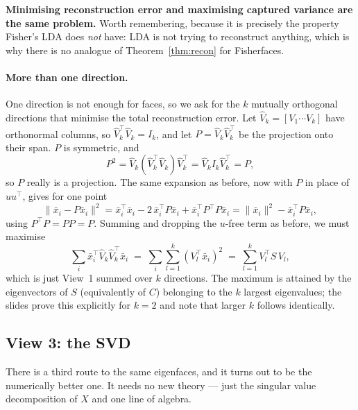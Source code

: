 \documentclass[11pt]{article}
\theoremstyle{definition}
\theoremstyle{remark}
\begin{document}
\textbf{Minimising reconstruction error and maximising captured variance are the
same problem.} Worth remembering, because it is precisely the property Fisher's
LDA does \emph{not} have: LDA is not trying to reconstruct anything, which is why
there is no analogue of Theorem~\ref{thm:recon} for Fisherfaces.

\paragraph{More than one direction.} One direction is not enough for faces, so we
ask for the $k$ mutually orthogonal directions that minimise the total
reconstruction error. Let $\hat{V}_k=[V_1\cdots V_k]$ have orthonormal columns, so
$\hat{V}_k^{\!\top}\hat{V}_k=I_k$, and let $P=\hat{V}_k\hat{V}_k^{\!\top}$ be the
projection onto their span. $P$ is symmetric, and
\[
  P^2=\hat{V}_k(\hat{V}_k^{\!\top}\hat{V}_k)\hat{V}_k^{\!\top}=\hat{V}_k I_k\hat{V}_k^{\!\top}=P,
\]
so $P$ really is a projection. The same expansion as before, now with $P$ in place
of $uu^{\!\top}$, gives for one point
\[
  \|\bar{x}_i-P\bar{x}_i\|^2
  = \bar{x}_i^{\!\top}\bar{x}_i - 2\,\bar{x}_i^{\!\top} P\bar{x}_i + \bar{x}_i^{\!\top} P^{\!\top}P\bar{x}_i
  = \|\bar{x}_i\|^2 - \bar{x}_i^{\!\top} P\bar{x}_i ,
\]
using $P^{\!\top}P = PP = P$. Summing and dropping the $u$-free term as before, we
must maximise
\[
  \sum_{i} \bar{x}_i^{\!\top}\hat{V}_k\hat{V}_k^{\!\top}\bar{x}_i
  \;=\; \sum_{i}\sum_{l=1}^{k}(V_l^{\!\top}\bar{x}_i)^2
  \;=\; \sum_{l=1}^{k} V_l^{\!\top} S\, V_l ,
\]
which is just View~1 summed over $k$ directions. The maximum is attained by the
eigenvectors of $S$ (equivalently of $C$) belonging to the $k$ largest
eigenvalues; the slides prove this explicitly for $k=2$ and note that larger $k$
follows identically.

\subsection{View 3: the SVD}

There is a third route to the same eigenfaces, and it turns out to be the
numerically better one. It needs no new theory --- just the singular value
decomposition of $X$ and one line of algebra.
\end{document}
